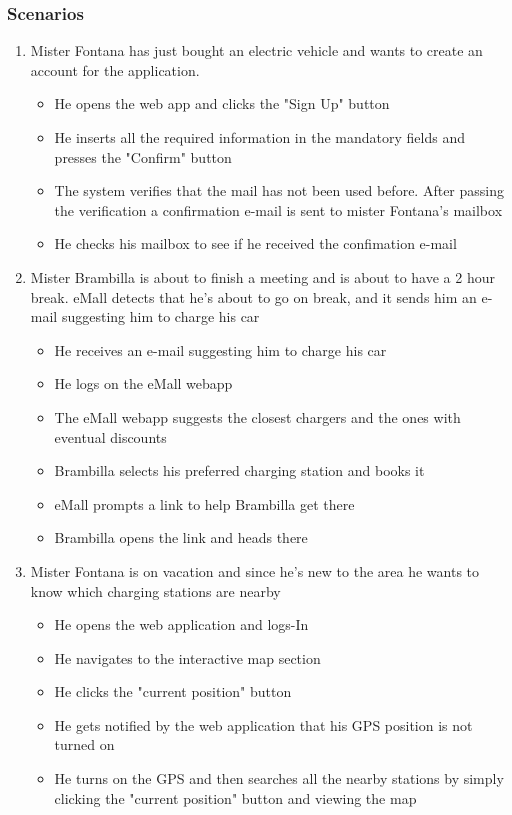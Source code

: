 \documentclass[table, 12pt]{article} %
\begin{document}
        \subsubsection{Scenarios}
        \label{scenarios}
            \begin{enumerate}
            
            \item Mister Fontana has just bought an electric vehicle and wants to create an account for the application.  
            \begin{itemize}
                \item He opens the web app and clicks the "Sign Up" button
                \item He inserts all the required information in the mandatory fields and presses the "Confirm" button
                \item The system verifies that the mail has not been used before. After passing the verification a confirmation e-mail is sent to mister Fontana's mailbox
                \item He checks his mailbox to see if he received the confimation e-mail
            \end{itemize}
                
            \item Mister Brambilla is about to finish a meeting and is about to have a 2 hour break. eMall detects that he's about to go on break, and it sends him an e-mail suggesting him to charge his car
            \begin{itemize}
                \item He receives an e-mail suggesting him to charge his car 
                \item He logs on the eMall webapp
                \item The eMall webapp suggests the closest chargers and the ones with eventual discounts
                \item Brambilla selects his preferred charging station and books it
                \item eMall prompts a link to help Brambilla get there
                \item Brambilla opens the link and heads there
            \end{itemize}

            \item Mister Fontana is on vacation and since he's new to the area he wants to know which charging stations are nearby
            \begin{itemize}
                \item He opens the web application and logs-In
                \item He navigates to the interactive map section
                \item He clicks the "current position" button
                \item He gets notified by the web application that his GPS position is not turned on
                \item He turns on the GPS and then searches all the nearby stations by simply clicking the "current position" button and viewing the map 
                

\end{itemize}
\end{enumerate}
\end{document}
